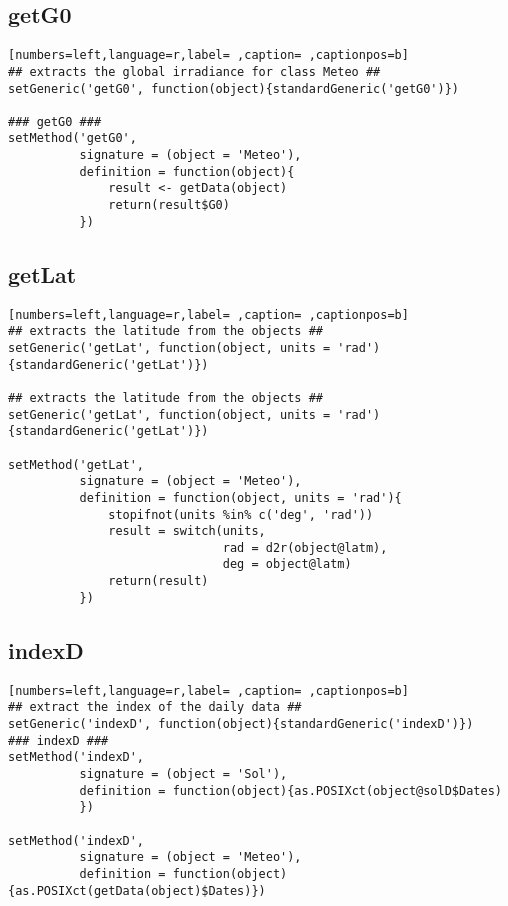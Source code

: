 \subsection{getG0}
\label{sec:orgbd0f1a9}
\begin{lstlisting}[numbers=left,language=r,label= ,caption= ,captionpos=b]
## extracts the global irradiance for class Meteo ##
setGeneric('getG0', function(object){standardGeneric('getG0')})

### getG0 ###
setMethod('getG0',
          signature = (object = 'Meteo'),
          definition = function(object){
              result <- getData(object)
              return(result$G0)
          })
\end{lstlisting}
\subsection{getLat}
\label{sec:org171bfde}
\begin{lstlisting}[numbers=left,language=r,label= ,caption= ,captionpos=b]
## extracts the latitude from the objects ##
setGeneric('getLat', function(object, units = 'rad')
{standardGeneric('getLat')})

## extracts the latitude from the objects ##
setGeneric('getLat', function(object, units = 'rad')
{standardGeneric('getLat')})

setMethod('getLat',
          signature = (object = 'Meteo'),
          definition = function(object, units = 'rad'){
              stopifnot(units %in% c('deg', 'rad'))
              result = switch(units,
                              rad = d2r(object@latm),
                              deg = object@latm)
              return(result)
          })
\end{lstlisting}
\subsection{indexD}
\label{sec:org3ed441d}
\begin{lstlisting}[numbers=left,language=r,label= ,caption= ,captionpos=b]
## extract the index of the daily data ##
setGeneric('indexD', function(object){standardGeneric('indexD')})
### indexD ###
setMethod('indexD',
          signature = (object = 'Sol'),
          definition = function(object){as.POSIXct(object@solD$Dates)
          })

setMethod('indexD',
          signature = (object = 'Meteo'),
          definition = function(object){as.POSIXct(getData(object)$Dates)})
\end{lstlisting}
